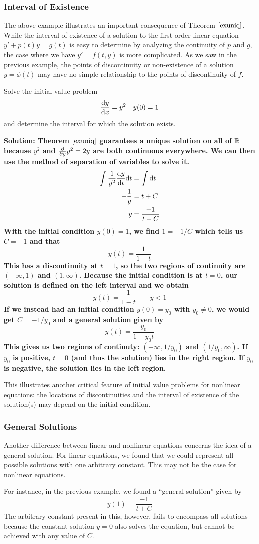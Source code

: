 \subsubsection{Interval of Existence}
The above example illustrates an important consequence of Theorem $\ref{exuniq}$. While the interval of existence of a solution to the first order linear equation $y' + p(t)y = g(t)$ is easy to determine by analyzing the continuity of $p$ and $g$, the case where we have $y' = f(t, y)$ is more complicated. As we saw in the previous example, the points of discontinuity or non-existence of a solution $y = \phi(t)$ may have no simple relationship to the points of discontinuity of $f$. 
\begin{example}
    Solve the initial value problem 
    \[ \dv{y}{x} = y^2 \quad y(0)=1\]
    and determine the interval for which the solution exists. \par
    \bf{Solution:} Theorem $\ref{exuniq}$ guarantees a unique solution on all of $\mathbb{R}$ because $y^2$ and $\pdv{y}y^2 = 2y$ are both continuous everywhere. We can then use the method of separation of variables to solve it.
    \begin{align*}
        \int \frac{1}{y^2}\dv{y}{t}\dd t &= \int \dd t \\
        -\frac{1}{y} &= t + C \\
        y &= \frac{-1}{t+C}
    \end{align*}
    With the initial condition $y(0)=1$, we find $1 = -1/C$ which tells us $C=-1$ and that
    \[ y(t) = \frac{1}{1-t} \]
    This has a discontinuity at $t=1$, so the two regions of continuity are $(-\infty, 1)$ and $(1, \infty)$. Because the initial condition is at $t=0$, our solution is defined on the left interval and we obtain
    \[ y(t) = \frac{1}{1-t} \qquad y < 1 \]
    If we instead had an initial condition $y(0) = y_0$ with $y_0 \neq 0$, we would get $C = -1/y_0$ and a general solution given by
    \[ y(t) = \frac{y_0}{1-y_0t}\]
    This gives us two regions of continuty: $(-\infty, 1/y_0)$ and $(1/y_0, \infty)$. If $y_0$ is positive, $t=0$ (and thus the solution) lies in the right region. If $y_0$ is negative, the solution lies in the left region. 
\end{example}
This illustrates another critical feature of initial value problems for nonlinear equations: the locations of discontinuities and the interval of existence of the solution(s) may depend on the initial condition. 
\subsubsection{General Solutions}
Another difference between linear and nonlinear equations concerns the idea of a general solution. For linear equations, we found that we could represent all possible solutions with one arbitrary constant. This may not be the case for nonlinear equations. \par
For instance, in the previous example, we found a ``general solution'' given by 
\[ y(1) = \frac{-1}{t+C} \]
The arbitrary constant present in this, however, fails to encompass all solutions because the constant solution $y=0$ also solves the equation, but cannot be achieved with any value of $C$.
